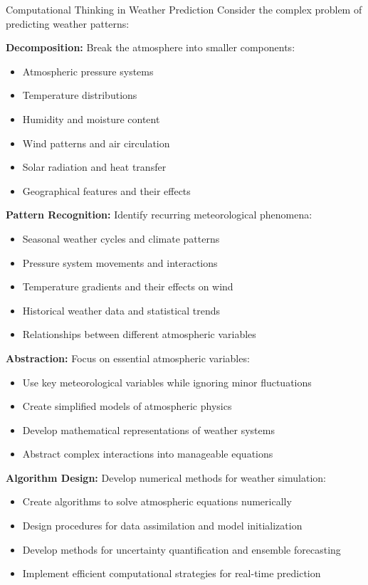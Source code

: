 \begin{examplebox}{Computational Thinking in Weather Prediction}
Consider the complex problem of predicting weather patterns:

\textbf{Decomposition:} Break the atmosphere into smaller components:
\begin{itemize}
  \item Atmospheric pressure systems
  \item Temperature distributions
  \item Humidity and moisture content
  \item Wind patterns and air circulation
  \item Solar radiation and heat transfer
  \item Geographical features and their effects
\end{itemize}

\textbf{Pattern Recognition:} Identify recurring meteorological phenomena:
\begin{itemize}
  \item Seasonal weather cycles and climate patterns
  \item Pressure system movements and interactions
  \item Temperature gradients and their effects on wind
  \item Historical weather data and statistical trends
  \item Relationships between different atmospheric variables
\end{itemize}

\textbf{Abstraction:} Focus on essential atmospheric variables:
\begin{itemize}
  \item Use key meteorological variables while ignoring minor fluctuations
  \item Create simplified models of atmospheric physics
  \item Develop mathematical representations of weather systems
  \item Abstract complex interactions into manageable equations
\end{itemize}

\textbf{Algorithm Design:} Develop numerical methods for weather simulation:
\begin{itemize}
  \item Create algorithms to solve atmospheric equations numerically
  \item Design procedures for data assimilation and model initialization
  \item Develop methods for uncertainty quantification and ensemble forecasting
  \item Implement efficient computational strategies for real-time prediction
\end{itemize}
\end{examplebox}

